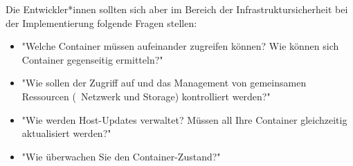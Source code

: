 Die Entwickler*innen sollten sich aber im Bereich der Infrastruktursicherheit bei der Implementierung folgende Fragen stellen:

\begin{itemize}
    \item "Welche Container müssen aufeinander zugreifen können? Wie können sich Container gegenseitig ermitteln?" \cite{ContainerSecurity}
    \item "Wie sollen der Zugriff auf und das Management von gemeinsamen Ressourcen (\zb\ Netzwerk und Storage) kontrolliert werden?" \cite{ContainerSecurity}
    \item "Wie werden Host-Updates verwaltet? Müssen all Ihre Container gleichzeitig aktualisiert werden?" \cite{ContainerSecurity}
    \item "Wie überwachen Sie den Container-Zustand?" \cite{ContainerSecurity}
\end{itemize}
